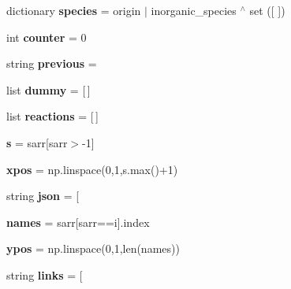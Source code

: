 \begin{DoxyCompactItemize}
dictionary {\bfseries species} = origin $\vert$ inorganic\+\_\+species $^\wedge$ set (\mbox{[}\textquotesingle{}\textquotesingle{} \mbox{]})
\item 
\mbox{\label{namespaceMCM__getdata_ad4d3c485621f3ca7a6aa71d5c538afc0}} 
int {\bfseries counter} = 0
\item 
\mbox{\label{namespaceMCM__getdata_a5934db315647a300329373175a38137e}} 
string {\bfseries previous} = \textquotesingle{}\textquotesingle{}
\item 
\mbox{\label{namespaceMCM__getdata_a4a161c3489ef4b4a107ecd681bf6123e}} 
list {\bfseries dummy} = \mbox{[}$\,$\mbox{]}
\item 
\mbox{\label{namespaceMCM__getdata_a49ab3d994518599583c42248fd8053f7}} 
list {\bfseries reactions} = \mbox{[}$\,$\mbox{]}
\item 
\mbox{\label{namespaceMCM__getdata_a85e857599ace3e5a3b56f77d60aefa1e}} 
{\bfseries s} = sarr\mbox{[}sarr$>$-\/1\mbox{]}
\item 
\mbox{\label{namespaceMCM__getdata_a0fe98f381a6163e79347e5f01f0d3e1a}} 
{\bfseries xpos} = np.\+linspace(0,1,s.\+max()+1)
\item 
\mbox{\label{namespaceMCM__getdata_a92be93a6a2306fa302ee4fff611400c8}} 
string {\bfseries json} = \textquotesingle{}\mbox{[}\textquotesingle{}
\item 
\mbox{\label{namespaceMCM__getdata_a33d8b5a09486bdfeffe10a5cdac866d0}} 
{\bfseries names} = sarr\mbox{[}sarr==i\mbox{]}.index
\item 
\mbox{\label{namespaceMCM__getdata_aee541ad37acdaffad20e364a8c85ab82}} 
{\bfseries ypos} = np.\+linspace(0,1,len(names))
\item 
\mbox{\label{namespaceMCM__getdata_a86ae28fe958e0ae9447f74a498953db6}} 
string {\bfseries links} = \textquotesingle{}\mbox{[}\textquotesingle{}
\item 

\end{DoxyCompactItemize}
